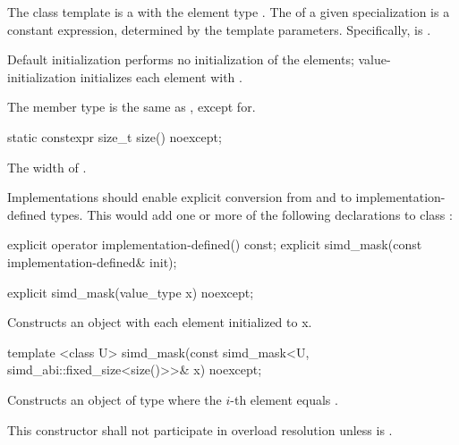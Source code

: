 

\pnum The class template \mask is a \dataparalleltype with the element type \bool.
The \width of a given \mask specialization is a constant expression, determined by the template parameters.
Specifically,  is \true.


\pnum Default initialization performs no initialization of the elements; value-initialization initializes each element with \false.

\pnum The member type  is the same as , except for.

\begin{itemdecl}
static constexpr size_t size() noexcept;
\end{itemdecl}
\begin{itemdescr}
  \pnum\returns The width of \simd[<T, Abi>].
\end{itemdescr}

\pnum Implementations should enable explicit conversion from and to implementation-defined types.
This would add one or more of the following declarations to class \mask:
\begin{itemdecl}
explicit operator implementation-defined() const;
explicit simd_mask(const implementation-defined& init);
\end{itemdecl}

\begin{itemdecl}
explicit simd_mask(value_type x) noexcept;
\end{itemdecl}
\begin{itemdescr}
  \pnum\effects Constructs an object with each element initialized to \code x.
\end{itemdescr}

\begin{itemdecl}
template <class U> simd_mask(const simd_mask<U, simd_abi::fixed_size<size()>>& x) noexcept;
\end{itemdecl}
\begin{itemdescr}
  \pnum\effects Constructs an object of type \mask where the $i$-th element equals  \foralli.

  \pnum\remarks This constructor shall not participate in overload resolution unless  is \fixedsizescoped{}.
\end{itemdescr}

